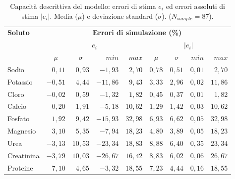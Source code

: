 \begin{table}[htb]
	\centering
	\caption{Capacità descrittiva del modello: errori di stima $e_i$ ed errori assoluti di stima $|e_i|$. Media ($\mu$) e deviazione standard ($\sigma$). ($N_{sample}=87$).}\label{tab:descrizione}
	\begin{tabular}{lrrrrrrrr}
	\toprule 
		\textbf{Soluto}   &  \multicolumn{8}{c}{\textbf{Errori di simulazione (\%)}}  \\
		\cmidrule(lr){2-9}
				              &        \multicolumn{4}{c}{$e_i$}             &       \multicolumn{4}{c}{$|e_i|$}             \\
		                  & \multicolumn{1}{c}{$\mu$}      & \multicolumn{1}{c}{$\sigma$}   & $min$   & $max$   & \multicolumn{1}{c}{$\mu$}     & \multicolumn{1}{c}{$\sigma$}   & $min$   & $max$  \\
    \cmidrule(lr){2-5}\cmidrule(lr){6-9}
  	Sodio             & $ 0,11$     & $ 0,93$    & $ -1,93$  & $2,70$  & $0,78$   & $0,51$     & $0,01$ & $ 2,70$   \\
  	Potassio          & $-0,51$     & $ 4,44$    & $-11,86$  & $9,43$  & $3,33$   & $2,96$     & $0,02$ & $11,86$  \\
  	Cloro             & $-0,02$     & $ 0,59$    & $ -1,32$  & $1,82$  & $0,45$   & $0,37$     & $0,01$ & $ 1,82$   \\
  	Calcio            & $ 0,20$     & $ 1,91$    & $ -5,18$  & $10,62$ & $1,29$   & $1,42$     & $0,03$ & $10,62$  \\
  	Fosfato           & $ 1,92$     & $ 9,42$    & $-15,93$  & $32,98$ & $6,93$   & $6,62$     & $0,05$ & $32,98$  \\
  	Magnesio          & $ 3,10$     & $ 5,35$    & $ -7,94$  & $18,23$ & $4,80$   & $3,89$     & $0,05$ & $18,23$  \\
  	Urea              & $-3,13$     & $10,53$    & $-23,34$  & $18,83$ & $8,88$   & $6,40$     & $0,35$ & $23,34$  \\
  	Creatinina        & $-3,79$     & $10,03$    & $-26,67$  & $16,42$ & $8,83$   & $6,02$     & $0,06$ & $26,67$  \\
  	Proteine          & $ 7,10$     & $ 4,65$    & $ -3,32$  & $18,55$ & $7,23$   & $4,44$     & $0,16$ & $18,55$  \\
  \bottomrule
\end{tabular}
\end{table}

